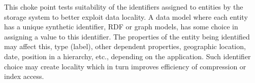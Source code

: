
This choke point tests suitability of the identifiers assigned to entities by
the storage system to better exploit data locality. A data model where each
entity has a unique synthetic identifier, \eg RDF or graph models, has some
choice in assigning a value to this identifier. The properties of the entity
being identified may affect this, \eg type (label), other dependent properties,
\eg geographic location, date, position in a hierarchy, etc., depending on the
application. Such identifier choice may create locality which in turn improves
efficiency of compression or index access.



